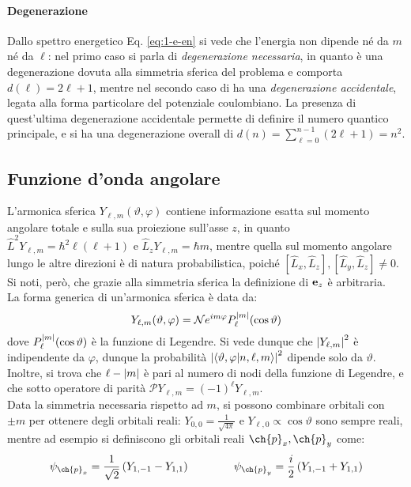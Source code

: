 \paragraph{Degenerazione}

Dallo spettro energetico Eq. \ref{eq:1-e-en} si vede che l'energia non dipende né da $ m $ né da $ \ell $: nel primo caso si parla di \textit{degenerazione necessaria}, in quanto è una degenerazione dovuta alla simmetria sferica del problema e comporta $ d(\ell) = 2\ell + 1 $, mentre nel secondo caso di ha una \textit{degenerazione accidentale}, legata alla forma particolare del potenziale coulombiano. La presenza di quest'ultima degenerazione accidentale permette di definire il numero quantico principale, e si ha una degenerazione overall di $ d(n) = \sum_{\ell = 0}^{n-1} (2\ell + 1) = n^2 $.

\subsection{Funzione d'onda angolare}

L'armonica sferica $ Y_{\ell,m}(\vartheta,\varphi) $ contiene informazione esatta sul momento angolare totale e sulla sua proiezione sull'asse $ z $, in quanto $ \hat{L}^2 Y_{\ell,m} = \hbar^2 \ell (\ell + 1) $ e $ \hat{L}_z Y_{\ell,m} = \hbar m $, mentre quella sul momento angolare lungo le altre direzioni è di natura probabilistica, poiché $ [\hat{L}_x , \hat{L}_z],[\hat{L}_y , \hat{L}_z] \neq 0 $. Si noti, però, che grazie alla simmetria sferica la definizione di $ \mathbf{e}_z $ è arbitraria.\\
La forma generica di un'armonica sferica è data da:
\begin{equation}
	Y_{\ell,m}(\vartheta,\varphi) = \mathcal{N} e^{i m \varphi} P_\ell^{\left\lvert m\right\rvert}(\cos \vartheta)
\end{equation}
dove $ P_\ell^{\left\lvert m\right\rvert}(\cos \vartheta) $ è la funzione di Legendre. Si vede dunque che $ \left\lvert Y_{\ell,m}\right\rvert^2 $ è indipendente da $ \varphi $, dunque la probabilità $ \left\lvert\braket{\vartheta,\varphi | n,\ell,m}\right\rvert^2 $ dipende solo da $ \vartheta $. Inoltre, si trova che $ \ell - \left\lvert m\right\rvert $ è pari al numero di nodi della funzione di Legendre, e che sotto operatore di parità $ \mathcal{P} Y_{\ell,m} = (-1)^\ell Y_{\ell,m} $.\\
Data la simmetria necessaria rispetto ad $ m $, si possono combinare orbitali con $ \pm m $ per ottenere degli orbitali reali: $ Y_{0,0} = \frac{1}{\sqrt{4\pi}} $ e $ Y_{\ell,0} \propto \cos{\vartheta} $ sono sempre reali, mentre ad esempio si definiscono gli orbitali reali $ \ch{p}_x , \ch{p}_y $ come:
\begin{equation*}
	\psi_{\ch{p}_x} = \frac{1}{\sqrt{2}} \left( Y_{1,-1} - Y_{1,1} \right)
	\qquad \qquad
	\psi_{\ch{p}_y} = \frac{i}{2} \left( Y_{1,-1} + Y_{1,1} \right)
\end{equation*}

